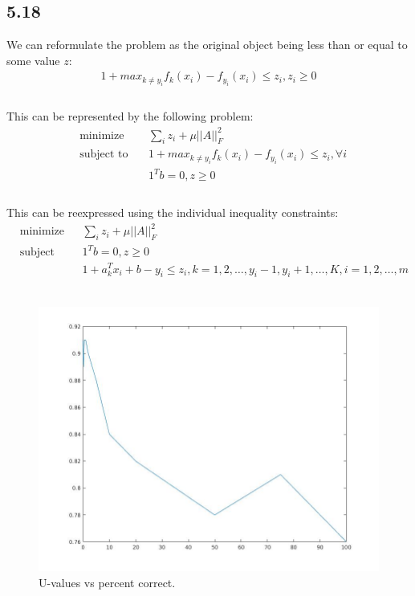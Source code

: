 \documentclass[12pt]{article}
\begin{document}
\subsection*{5.18}
We can reformulate the problem as the original object being less than or equal to some value $z$:
\begin{equation*}
\begin{aligned}
1+max_{k\neq y_i} f_k(x_i)  - f_{y_i} (x_i) \leq z_i,  z_i\geq 0\\
\end{aligned}
\end{equation*}\\
This can be represented by the following problem:
\begin{equation*}
\begin{aligned}
& \underset{}{\text{minimize}}
& &  \sum_i z_i + \mu ||A||_F^2\\
& \text{subject to}\
& & 1+max_{k\neq y_i} f_k(x_i) - f_{y_i} (x_i) \leq z_i, \forall i\\
&&&  1^T b= 0,   z \geq 0\\
\end{aligned}
\end{equation*}\\
This can be reexpressed using the individual inequality constraints:
\begin{equation*}
\begin{aligned}
& \underset{}{\text{minimize}}
& &  \sum_i z_i + \mu ||A||_F^2\\
& \text{subject to}\
& &  1^T b= 0,   z \geq 0\\
&&&  1+a_k^Tx_i + b  - y_i \leq z_i,    k = 1, 2, …,  y_i -1, y_i +1, …, K, i=1, 2, …, m
\end{aligned}
\end{equation*}\\
\begin{figure}[t]
\centering
\includegraphics[scale=.25]{Problem_5_18.jpg}
\caption{U-values vs percent correct.}
\end{figure}
\end{document}

